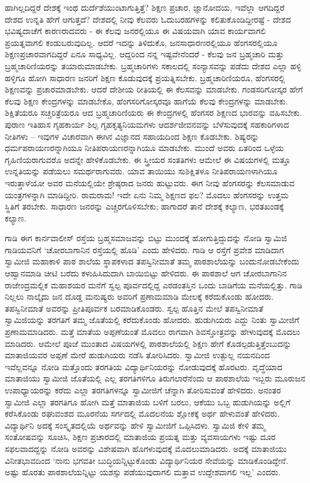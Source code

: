 ಹಾಗಿಲ್ಲದಿದ್ದರೆ ದೇಶಕ್ಕೆ ಇಂಥ ದುರ್ದೆಶೆಯುಂಟಾಗುತ್ತಿತ್ತೆ? ಶಿಕ್ಷಣ ಪ್ರಚಾರ, ಜ್ಞಾನೋದಯ, ಇವೆಲ್ಲಾ ಆಗದಿದ್ದರೆ ದೇಶದ ಉನ್ನತಿ ಹೇಗೆ ಆಗುತ್ತದೆ? ದೇಶದಲ್ಲಿ ನೀವು ಕೆಲವರು ಓದುಬರಹಗಳನ್ನು ಕಲಿತುಕೊಂಡಿದ್ದೀರಷ್ಟೆ - ದೇಶದ ಭವಿಷ್ಯದಾಚೆಗೆ ಕಾರಣರಾದವರು - ಈ ಕೆಲವು ಜನರಲ್ಲಿಯೂ ಈ ವಿಷಯವಾಗಿ ಯಾವ ಕಾರ್ಯವಾಗಲಿ ಪ್ರಯತ್ನವಾಗಲಿ ಕಂಡುಬರುವುದಿಲ್ಲ. ಆದರೆ ಇದನ್ನು ತಿಳಿದುಕೊ, ಜನಸಾಧಾರಣರಲ್ಲಿಯೂ ಹೆಂಗಸರಲ್ಲಿಯೂ ಶಿಕ್ಷಣಪ್ರಚಾರವಾಗದಿದ್ದರೆ ಏನೂ ಸಾಧ್ಯವಿಲ್ಲ. ಆದ್ದರಿಂದ ನನ್ನ ಇಷ್ಟವೇನೆಂದರೆ - ಕೆಲವು ಜನ ಬ್ರಹ್ಮಚಾರಿ ಮತ್ತು ಬ್ರಹ್ಮಚಾರಿಣಿಯರನ್ನು ತಯಾರುಮಾಡಬೇಕು. ಬ್ರಹ್ಮಚಾರಿಗಳು ಸಕಾಲದಲ್ಲಿ ಸಂನ್ಯಾಸವನ್ನು ಪಡೆದು ದೇಶದ ಎಲ್ಲಾ ಹಳ್ಳಿ ಹಳ್ಳಿಗೂ ಹೋಗಿ ಸಾಧಾರಣ ಜನರಿಗೆ ಶಿಕ್ಷಣ ಕೊಡುವುದಕ್ಕೆ ಪ್ರಯತ್ನಿಸಬೇಕು. ಬ್ರಹ್ಮಚಾರಿಣಿಯರೂ, ಹೆಂಗಸರಲ್ಲಿ ಶಿಕ್ಷಣವನ್ನು ಪ್ರಚಾರಮಾಡಬೇಕು. ಆದರೆ ದೇಶೀಯ ರೀತಿಯಲ್ಲಿ ಈ ಕೆಲಸವನ್ನು ಮಾಡಬೇಕು. ಗಂಡಸರಿಗೋಸ್ಕರ ಹೇಗೆ ಕೆಲವು ಶಿಕ್ಷಣ ಕೇಂದ್ರಗಳನ್ನು ಮಾಡಬೇಕೊ, ಹೆಂಗಸರಿಗೋಸ್ಕರವೂ ಹಾಗೆಯೆ ಕೆಲವು ಕೇಂದ್ರಗಳನ್ನು ಮಾಡಬೇಕು. ಶಿಕ್ಷಿತೆಯರೂ ಸಚ್ಚರಿತ್ರೆಯರೂ ಆದ ಬ್ರಹ್ಮಚಾರಿಣಿಯರು ಈ ಕೇಂದ್ರಗಳಲ್ಲಿ ಹೆಂಗಸರ ಶಿಕ್ಷಣದ ಭಾರವನ್ನು ವಹಿಸಬೇಕು. ಪುರಾಣ ಇತಿಹಾಸ ಗೃಹಕಾರ್ಯ ಶಿಲ್ಪ ಗೃಹಕೃತ್ಯನಿಯಮಗಳು ಆದರ್ಶಜೀವನವನ್ನು ಬೆಳೆಸುವುದಕ್ಕೆ ಸಹಕಾರಿಗಳಾದ ನೀತಿಗಳು – ಇವುಗಳ ವಿಚಾರವಾಗಿ ಈಗಿನ ವಿಜ್ಞಾನದ ಸಹಾಯದಿಂದ ಶಿಕ್ಷಣ ಕೊಡಬೇಕು. ಶಿಷ್ಯರನ್ನು ಧರ್ಮಪರಾಯಣರನ್ನಾಗಿಯೂ ನೀತಿಪರಾಯಣರನ್ನಾಗಿಯೂ ಮಾಡಬೇಕು. ಮುಂದೆ ಅವರು ಏತರಿಂದ ಒಳ್ಳೆಯ ಗೃಹಿಣಿಯರಾಗುವರೊ ಅದನ್ನೇ ಹೇಳಿಕೊಡಬೇಕು. ಈ ಸ್ತ್ರೀಯರ ಸಂತತಿಗಳು ಆಮೇಲೆ ಈ ವಿಷಯಗಳಲ್ಲಿ ಮತ್ತೂ ಉನ್ನತಿಯನ್ನು ಪಡೆಯಲು ಸಮರ್ಥರಾಗುವರು. ಯಾವ ತಾಯಿಯು ಸುಶಿಕ್ಷಿತಳೂ ನೀತಿಪರಾಯಣಳಾಗಿಯೂ ಇರುತ್ತಾಳೆಯೋ ಅವರ ಮನೆಯಲ್ಲಿಯೇ ಶ್ರೇಷ್ಠರಾದ ಜನರು ಹುಟ್ಟುವರು. ಈಗ ನೀವು ಹೆಂಗಸರನ್ನು ಕೆಲಸಮಾಡುವ ಯಂತ್ರಗಳನ್ನಾಗಿ ಮಾಡಿದ್ದೀರಿ. ರಾಮರಾಮ! ಇದೇ ಏನು ನಿಮ್ಮ ಶಿಕ್ಷಣದ ಫಲ? ಮೊದಲು ಹೆಂಗಸರನ್ನು ಉತ್ತಮ ಸ್ಥಿತಿಗೆ ತರಬೇಕು. ಸಾಧಾರಣ ಜನರನ್ನು ಎಚ್ಚರಗೊಳಿಸಬೇಕು; ಹಾಗಾದರೆ ತಾನೆ ದೇಶಕ್ಕೆ ಕಲ್ಯಾಣ, ಭರತಖಂಡಕ್ಕೆ ಕಲ್ಯಾಣ.

ಗಾಡಿ ಈಗ ಕಾರ್ನವಾಲೀಸ್ ರಸ್ತೆಯ ಬ್ರಹ್ಮಸಮಾಜವನ್ನು ಬಿಟ್ಟು ಮುಂದಕ್ಕೆ ಹೋಗುತ್ತಿದ್ದುದನ್ನು ನೋಡಿ ಸ್ವಾಮಿಜಿ ಗಾಡಿಯವನಿಗೆ ‘ಚೋರಬಾಗಾನಿನ ರಸ್ತೆಯಲ್ಲಿ ಹೊಡಿ’ ಎಂದು ಹೇಳಿದರು. ಗಾಡಿ ಆ ರಸ್ತೆಗೆ ಪ್ರವೇಶ ಮಾಡಿದಾಗ ಸ್ವಾಮೀಜಿ ಮಹಾಕಾಳಿ ಪಾಠ ಶಾಲೆಯ ಸ್ಥಾಪಕಳಾದ ತಪಸ್ವಿನೀಮಾತೆ ತಮ್ಮ ಪಾಠಶಾಲೆಯನ್ನು ಬಂದುನೋಡಬೇಕೆಂದು ಆಹ್ವಾನಮಾಡಿ ಚೀಟಿ ಬರೆದು ಕಳುಹಿಸಿದುದಾಗಿ ಬಾಯಿಬಿಟ್ಟು ಹೇಳಿದರು. ಈ ಪಾಠಶಾಲೆ ಆಗ ಚೋರಬಾಗಾನಿನ ರಾಜೇಂದ್ರಮಲ್ಲಿಕ ಮಹಾಶಯರ ಮನೆಗೆ ಸ್ವಲ್ಪ ಪೂರ್ವದಲ್ಲಿದ್ದ ಎರಡಂತಸ್ತಿನ ಒಂದು ಬಾಡಿಗೆಯ ಮನೆಯಲ್ಲಿತ್ತು. ಗಾಡಿ ನಿಲ್ಲಲು ನಾಲ್ಕೈದು ಜನ ದೊಡ್ಡ ಮನುಷ್ಯರು ಅವರಿಗೆ ಪ್ರಣಾಮಮಾಡಿ ಮೇಲಕ್ಕೆ ಕರೆದುಕೊಂಡು ಹೋದರು. ತಪಸ್ವಿನೀಮಾತೆ ಅವರನ್ನು ಪ್ರೀತಿಪೂರ್ವಕ ಬರಮಾಡಿಕೊಂಡರು. ಸ್ವಲ್ಪ ಹೊತ್ತಿನ ಮೇಲೆ ತಪಸ್ವಿನೀಮಾತೆ ಸ್ವಾಮಿಜಿಯನ್ನು ತರಗತಿಗೆ ತಮ್ಮ ಜೊತೆಯಲ್ಲಿ ಕರೆದುಕೊಂಡು ಹೋದರು. ಹುಡುಗಿಯರು ಎದ್ದು ನಿಂತು ಸ್ವಾಮೀಜಿಗೆ ಪ್ರಣಾಮಮಾಡಿದರು. ಮತ್ತೆ ಮಾತೆಯ ಅಪ್ಪಣೆಯಂತೆ ಮೊದಲು ರಾಗವಾಗಿ ಶಿವಸ್ತೋತ್ರವನ್ನು ಹೇಳುವುದಕ್ಕೆ ಮೊದಲು ಮಾಡಿದರು. ಆಮೇಲೆ ಪೂಜೆ ಮುಂತಾದ ವಿಷಯಗಳಲ್ಲಿ ಪಾಠಶಾಲೆಯಲ್ಲಿ ಶಿಕ್ಷಣ ಹೇಗೆ ಕೊಡಲ್ಪಡುತ್ತಿತ್ತೆಂಬುದನ್ನು ಮಾತಾಜಿಯವರ ಅಪ್ಪಣೆ ಮೇರೆ ಹುಡುಗಿಯರು ನಡೆಸಿ ತೋರಿಸಿದರು. ಸ್ವಾಮೀಜಿ ಉತ್ಫುಲ್ಲ ನಯನದಿಂದ ಇವೆಲ್ಲವನ್ನೂ ನೋಡಿ ಮತ್ತೊಂದು ತರಗತಿಯ ವಿದ್ಯಾರ್ಥಿನಿಯರನ್ನು ನೋಡುವುದಕ್ಕೆ ಹೊರಟರು. ವೃದ್ಧೆಯಾದ ಮಾತಾಜಿಯು ಸ್ವಾಮೀಜಿ ಜೊತೆಯಲ್ಲಿ ಎಲ್ಲ ತರಗತಿಗಳಿಗೂ ತಿರುಗಲಾರೆನೆಂದು ಆ ಪಾಠಶಾಲೆಯ ಇಬ್ಬರು ಮೂರುಜನ ಉಪಾಧ್ಯಾಯರನ್ನು ಕರೆದು ಎಲ್ಲಾ ತರಗತಿಗಳನ್ನೂ ಸ್ವಾಮೀಜಿಗೆ ಚೆನ್ನಾಗಿ ತೋರಿಸುವಂತೆ ಹೇಳಿದರು. ಅನಂತರ ಸ್ವಾಮೀಜಿ ಎಲ್ಲಾ ತರಗತಿಗೂ ಹೋಗಿ ಮತ್ತೆ ಮಾತಾಜಿಯ ಬಳಿಗೆ ಬರಲು, ಆಕೆಯು ಒಬ್ಬ ಹುಡುಗಿಯನ್ನು ಅಲ್ಲಿಗೆ ಕರೆಸಿಕೊಂಡು ರಘುವಂಶದ ಮೂರನೆಯ ಸರ್ಗದಲ್ಲಿ ಮೊದಲನೆಯ ಶ್ಲೋಕಕ್ಕೆ ಅರ್ಥ ಹೇಳುವಂತೆ ಹೇಳಿದರು. ವಿದ್ಯಾರ್ಥಿನಿ ಅದಕ್ಕೆ ಸಂಸ್ಕೃತದಲ್ಲಿಯೆ ಅರ್ಥವನ್ನು ಹೇಳಿ ಸ್ವಾಮೀಜಿಗೆ ಒಪ್ಪಿಸಿದಳು. ಸ್ವಾಮಿಜಿ ಕೇಳಿ ತಮ್ಮ ಸಂತೋಷವನ್ನು ಸೂಚಿಸಿ, ಶಿಕ್ಷಣ ಪ್ರಚಾರದಲ್ಲಿ ಮಾತಾಜಿಯ ಪ್ರಯತ್ನ ಮತ್ತು ವ್ಯವಸಾಯಗಳು ಇಷ್ಟು ದೂರ ಸಫಲವಾದದ್ದನ್ನು ನೋಡಿ ಅವರನ್ನು ವಿಶೇಷವಾಗಿ ಹೊಗಳುವುದಕ್ಕೆ ಮೊದಲುಮಾಡಿದರು. ಅದಕ್ಕೆ ಮಾತಾಜಿಯು ವಿನೀತಭಾವದಿಂದ ‘ನಾನು ಭಗವತೀ ಬುದ್ಧಿಯನ್ನಿಟ್ಟುಕೊಂಡು ವಿದ್ಯಾರ್ಥಿನಿಯರ ಸೇವೆಯನ್ನು ಮಾಡಿಕೊಂಡಿದ್ದೇನೆ. ಅಷ್ಟು ಹೊರತು ಪಾಠಶಾಲೆಯನ್ನಿಟ್ಟು ಯಶಸ್ಸು ಪಡೆಯುವುದಾಗಲಿ ಮತ್ತಾವ ಉದ್ದೇಶವಾಗಲಿ ಇಲ್ಲ’ ಎಂದರು.

